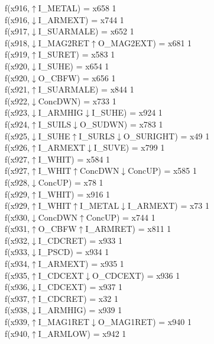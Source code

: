 f(x916,$\uparrow$I\_METAL) = x658 {1} \\
f(x916,$\downarrow$I\_ARMEXT) = x744 {1} \\
f(x917,$\downarrow$I\_SUARMALE) = x652 {1} \\
f(x918,$\downarrow$I\_MAG2RET$\uparrow$O\_MAG2EXT) = x681 {1} \\
f(x919,$\uparrow$I\_SURET) = x583 {1} \\
f(x920,$\downarrow$I\_SUHE) = x654 {1} \\
f(x920,$\downarrow$O\_CBFW) = x656 {1} \\
f(x921,$\uparrow$I\_SUARMALE) = x844 {1} \\
f(x922,$\downarrow$ConcDWN) = x733 {1} \\
f(x923,$\downarrow$I\_ARMHIG$\downarrow$I\_SUHE) = x924 {1} \\
f(x924,$\uparrow$I\_SUILS$\downarrow$O\_SUDWN) = x783 {1} \\
f(x925,$\downarrow$I\_SUHE$\uparrow$I\_SURLS$\downarrow$O\_SURIGHT) = x49 {1} \\
f(x926,$\uparrow$I\_ARMEXT$\downarrow$I\_SUVE) = x799 {1} \\
f(x927,$\uparrow$I\_WHIT) = x584 {1} \\
f(x927,$\uparrow$I\_WHIT$\uparrow$ConcDWN$\downarrow$ConcUP) = x585 {1} \\
f(x928,$\downarrow$ConcUP) = x78 {1} \\
f(x929,$\uparrow$I\_WHIT) = x916 {1} \\
f(x929,$\uparrow$I\_WHIT$\uparrow$I\_METAL$\downarrow$I\_ARMEXT) = x73 {1} \\
f(x930,$\downarrow$ConcDWN$\uparrow$ConcUP) = x744 {1} \\
f(x931,$\uparrow$O\_CBFW$\uparrow$I\_ARMRET) = x811 {1} \\
f(x932,$\downarrow$I\_CDCRET) = x933 {1} \\
f(x933,$\downarrow$I\_PSCD) = x934 {1} \\
f(x934,$\uparrow$I\_ARMEXT) = x935 {1} \\
f(x935,$\uparrow$I\_CDCEXT$\downarrow$O\_CDCEXT) = x936 {1} \\
f(x936,$\downarrow$I\_CDCEXT) = x937 {1} \\
f(x937,$\uparrow$I\_CDCRET) = x32 {1} \\
f(x938,$\downarrow$I\_ARMHIG) = x939 {1} \\
f(x939,$\uparrow$I\_MAG1RET$\downarrow$O\_MAG1RET) = x940 {1} \\
f(x940,$\uparrow$I\_ARMLOW) = x942 {1} \\
